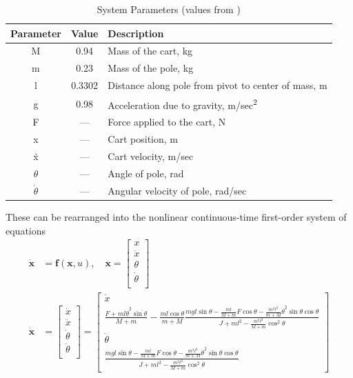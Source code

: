\documentclass{article}
\newcommand{\matr}[1]{\bm{#1}}     %
\begin{document}
\begin{table}[h!]
 \centering
 \begin{tabular}{ |c |c  |l |}
 \hline
 	 \textbf{Parameter} & \textbf{Value} & \textbf{Description}  \\ \hline
 	 M & 0.94 & Mass of the cart, kg \\ \hline
 	 m & 0.23 & Mass of the pole, kg \\ \hline
 	 l & 0.3302 & Distance along pole from pivot to center of mass, m \\ \hline
 	 g & 0.98 & Acceleration due to gravity, m/{sec\textsuperscript{2}} \\ \hline
 	 F & --- & Force applied to the cart, N \\ \hline
 	 x & --- & Cart position, m \\ \hline
 	 \.x & --- & Cart velocity, m/sec \\ \hline
 	 $\theta$ & --- & Angle of pole, rad \\ \hline
 	 $\dot\theta$ & --- & Angular velocity of pole, rad/sec \\ \hline
 \end{tabular}
 \caption{System Parameters (values from \cite{lab6})}
 \label{table:paramvalues}
 \end{table}
These can be rearranged into the nonlinear continuous-time first-order system of equations
\begin{equation}
\begin{aligned}
\matr{\dot{x}} &= \matr{f}(\matr{x},u),\quad  \matr{x} = \begin{bmatrix}
	x \\
	\dot{x} \\
	\theta \\
	\dot{\theta} \\
\end{bmatrix} \\
\matr{\dot{x}} &= \begin{bmatrix}
	\dot{x} \\
	\ddot{x} \\
	\dot{\theta} \\
	\ddot{\theta} \\
\end{bmatrix} = \begin{bmatrix}
\dot{x} \\
\frac{F+ml\dot{\theta}^2\sin\theta}{M+m} -\frac{ml\cos\theta}{m+M}\frac{mgl\sin\theta- \frac{ml}{M+m} F\cos\theta -\frac{m^2l^2}{m+M}\dot{\theta}^2\sin\theta\cos\theta}{J+ml^2-\frac{m^2l^2}{M+m}\cos^2 \theta} \\[6pt]
\dot{\theta} \\
\frac{mgl\sin\theta - \frac{ml}{M+m} F\cos\theta -\frac{m^2l^2}{m+M}\dot{\theta}^2\sin\theta\cos\theta}{J+ml^2-\frac{m^2l^2}{M+m}\cos^2 \theta }
\end{bmatrix}
\end{aligned}
\label{eq:nonlinear_ss_continuous}
\end{equation}
\end{document}
